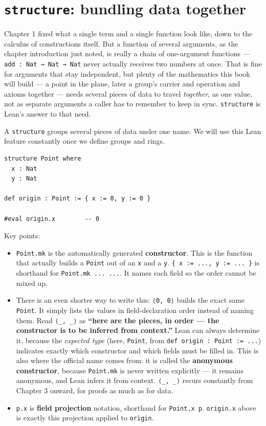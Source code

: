 \section{\texorpdfstring{\texttt{structure}: bundling data together}{structure: bundling data together}}\label{sec:02-functions-and-structures:01-structure-basics:1}

Chapter 1 fixed what a single term and a single function look like, down to the calculus of constructions itself. But a function of several arguments, as the chapter introduction just noted, is really a chain of one-argument functions --- \texttt{add : Nat → Nat → Nat} never actually receives two numbers at once. That is fine for arguments that stay independent, but plenty of the mathematics this book will build --- a point in the plane, later a group's carrier and operation and axioms together --- needs several pieces of data to travel \emph{together}, as one value, not as separate arguments a caller has to remember to keep in sync. \texttt{structure} is Lean's answer to that need.

A \texttt{structure} groups several pieces of data under one name. We will use this Lean feature constantly once we define groups and rings.

\begin{lstlisting}
structure Point where
  x : Nat
  y : Nat

def origin : Point := { x := 0, y := 0 }

#eval origin.x        -- 0
\end{lstlisting}

Key points:

\begin{itemize}
\tightlist
\item
  \texttt{Point.mk} is the automatically generated \textbf{constructor}. This is the function that actually builds a \texttt{Point} out of an \texttt{x} and a \texttt{y}. \texttt{\{ x := ..., y := ... \}} is shorthand for \texttt{Point.mk ... ...}. It names each field so the order cannot be mixed up.
\item
  There is an even shorter way to write this: \texttt{⟨0, 0⟩} builds the exact same \texttt{Point}. It simply lists the values in field-declaration order instead of naming them. Read \texttt{⟨\_\allowbreak{}, \_\allowbreak{}⟩} as \textbf{``here are the pieces, in order --- the constructor is to be inferred from context.''} Lean can always determine it, because the \emph{expected type} (here, \texttt{Point}, from \texttt{def origin : Point := ...}) indicates exactly which constructor and which fields must be filled in. This is also where the official name comes from: it is called the \textbf{anonymous constructor}, because \texttt{Point.mk} is never written explicitly --- it remains anonymous, and Lean infers it from context. \texttt{⟨\_\allowbreak{}, \_\allowbreak{}⟩} recurs constantly from Chapter 3 onward, for proofs as much as for data.
\item
  \texttt{p.x} is \textbf{field projection} notation, shorthand for \texttt{Point.x p}. \texttt{origin.x} above is exactly this projection applied to \texttt{origin}.
\end{itemize}

